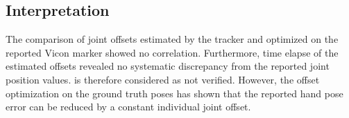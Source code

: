 \FloatBarrier

\subsection{Interpretation}

The comparison of joint offsets estimated by the tracker and optimized on the reported Vicon marker showed no correlation. Furthermore, time elapse of the estimated offsets revealed no systematic discrepancy from the reported joint position values.  is therefore considered as not verified.
However, the offset optimization on the ground truth poses has shown that the reported hand pose error can be reduced by a constant individual joint offset.
